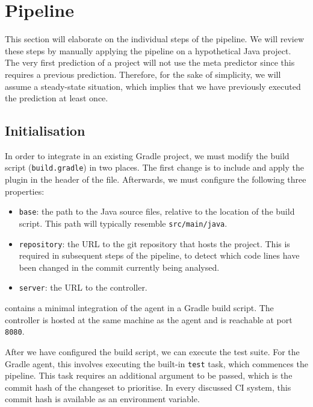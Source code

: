 
\section{Pipeline}
\label{sec:velocity-pipeline}
This section will elaborate on the individual steps of the pipeline. We will review these steps by manually applying the pipeline on a hypothetical Java project. The very first prediction of a project will not use the meta predictor since this requires a previous prediction. Therefore, for the sake of simplicity, we will assume a steady-state situation, which implies that we have previously executed the prediction at least once.

\subsection{Initialisation}\label{ssec:pipeline-initialisation}
In order to integrate \velocity{} in an existing Gradle project, we must modify the build script (\texttt{build.gradle}) in two places. The first change is to include and apply the plugin in the header of the file. Afterwards, we must configure the following three properties:
\begin{itemize}
	\item \texttt{base}: the path to the Java source files, relative to the location of the build script. This path will typically resemble \texttt{src/main/java}.
	
	\item \texttt{repository}: the URL to the git repository that hosts the project. This is required in subsequent steps of the pipeline, to detect which code lines have been changed in the commit currently being analysed.
	
	\item \texttt{server}: the URL to the controller.
\end{itemize}

\noindent {} contains a minimal integration of the agent in a Gradle build script. The controller is hosted at the same machine as the agent and is reachable at port \texttt{8080}.



\noindent After we have configured the build script, we can execute the test suite. For the Gradle agent, this involves executing the built-in \texttt{test} task, which commences the pipeline. This task requires an additional argument to be passed, which is the commit hash of the changeset to prioritise. In every discussed CI system, this commit hash is available as an environment variable.\\

